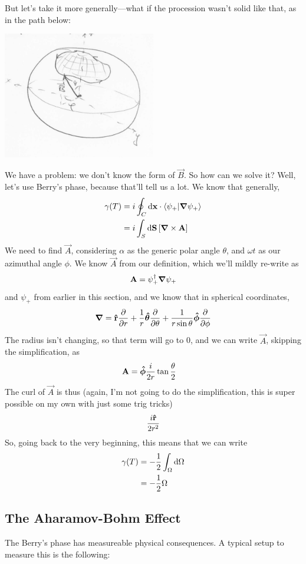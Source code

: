 \documentclass[a4paper]{article}
\begin{document}
But let's take it more generally---what if the procession wasn't solid like
that, as in the path below:
\begin{center}
	\includegraphics[width=0.5\textwidth]{BerrysField2.png}
\end{center}
We have a problem: we don't know the form of $\vec{B}$. So how can we solve it?
Well, let's use Berry's phase, because that'll tell us a lot. We know that
generally,
\begin{align*}
	\gamma(T) &= i\oint_C\mathrm{d}\boldsymbol{\mathbf{x}} \cdot \left\langle \psi_+\middle\vert \boldsymbol{\mathbf{\nabla}}\psi_+ \right\rangle\\
	&= i\int_S\mathrm{d}\boldsymbol{\mathbf{S}} \left[\boldsymbol{\mathbf{\nabla}}\times\boldsymbol{\mathbf{A}}\right]
\end{align*}
We need to find $\vec{A}$, considering $\alpha$ as the generic polar angle
$\theta$, and $\omega t$ as our azimuthal angle $\phi$. We know $\vec{A}$ from
our definition, which we'll mildly re-write as
\[
	\boldsymbol{\mathbf{A}} = \psi_+^\dagger \boldsymbol{\mathbf{\nabla}}\psi_+
\]
and $\psi_+$ from earlier in this section, and we know that in
spherical coordinates,
\[
	\del = \vhat{r}\pd{r} + \frac{1}{r}\vhat{\theta}\pd{\theta} +
	\frac{1}{r\sin\theta}\vhat{\phi}\pd{\phi}
\]
The radius isn't changing, so that term will go to 0, and we can write
$\vec{A}$, skipping the simplification, as
\begin{align*}
	\boldsymbol{\mathbf{A}} &= \boldsymbol{\mathbf{\hat{\phi}}}\frac{i}{2r}\tan\frac{\theta}{2}
\end{align*}
The curl of $\vec{A}$ is thus (again, I'm not going to do the simplification,
this is super possible on my own with just some trig tricks)
\[
	\frac{i\boldsymbol{\mathbf{\hat{r}}}}{2r^2}
\]
So, going back to the very beginning, this means that we can write
\begin{align*}
	\gamma(T) &= -\frac{1}{2}\int_\Omega\mathrm{d} \Omega\\
		  &= -\frac{1}{2}\Omega
\end{align*}

\subsection{The Aharamov-Bohm Effect}
The Berry's phase has measureable physical consequences. A typical setup to
measure this is the following:
\end{document}
